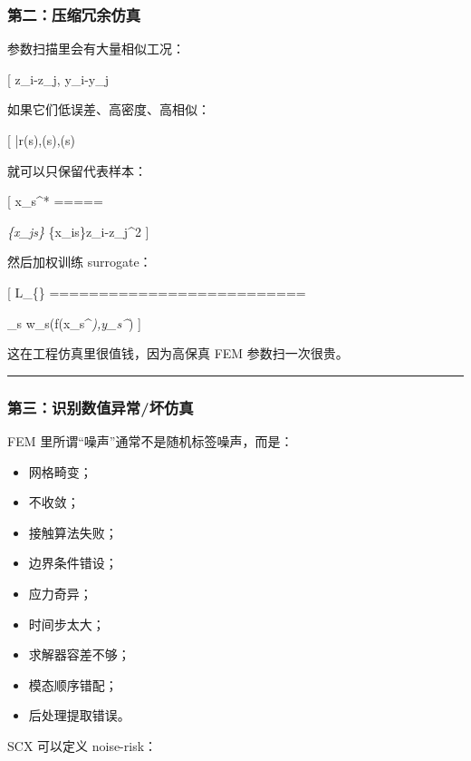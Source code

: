 \documentclass[
  12pt,
]{ctexart}
\providecommand{\tightlist}{%
  \setlength{\itemsep}{0pt}\setlength{\parskip}{0pt}}
\begin{document}
\subsubsection{第二：压缩冗余仿真}\label{ux7b2cux4e8cux538bux7f29ux5197ux4f59ux4effux771f}

参数扫描里会有大量相似工况：

{[} \textbar z\_i-z\_j\textbar{},\quad
\textbar y\_i-y\_j\textbar{}\approx 0{]}

如果它们低误差、高密度、高相似：

{[}
\bar r(s)\downarrow,\quad \rho(s)\uparrow,\quad {}(s)\uparrow{]}

就可以只保留代表样本：

{[} x\_s\^{}* =====

\arg\min\emph{\{x\_j\in s\}
\sum}\{x\_i\in s\}\textbar z\_i-z\_j\textbar\^{}2 {]}

然后加权训练 surrogate：

{[} \mathcal L\_\{\} ==========================

\sum\_s w\_s\ell(f(x\_s\^{}\emph{),y\_s\^{}}) {]}

这在工程仿真里很值钱，因为高保真 FEM 参数扫一次很贵。

\begin{center}\rule{0.5\linewidth}{0.5pt}\end{center}

\subsubsection{第三：识别数值异常/坏仿真}\label{ux7b2cux4e09ux8bc6ux522bux6570ux503cux5f02ux5e38ux574fux4effux771f}

FEM 里所谓``噪声''通常不是随机标签噪声，而是：

\begin{itemize}
\tightlist
\item
  网格畸变；
\item
  不收敛；
\item
  接触算法失败；
\item
  边界条件错设；
\item
  应力奇异；
\item
  时间步太大；
\item
  求解器容差不够；
\item
  模态顺序错配；
\item
  后处理提取错误。
\end{itemize}

SCX 可以定义 noise-risk：
\end{document}
